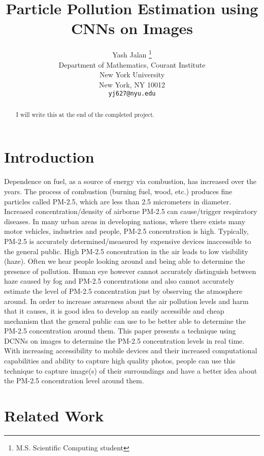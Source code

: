 \documentclass{article}
\title{Particle Pollution Estimation using CNNs on Images}
\author{
  Yash Jalan \thanks{M.S. Scientific Computing student} \\
  Department of Mathematics, Courant Institute\\
  New York University\\
  New York, NY 10012 \\
  \texttt{yj627@nyu.edu} \\
}
\begin{document}
\maketitle

\begin{abstract}
I will write this at the end of the completed project.
\end{abstract}



\section{Introduction}

Dependence on fuel, as a source of energy via combustion, has increased over the years. The process of combustion (burning fuel, wood, etc.) produces fine particles called PM-2.5, which are less than 2.5 micrometers in diameter. Increased concentration/density of airborne PM-2.5 can cause/trigger respiratory diseases. In many urban areas in developing nations, where there exists many motor vehicles, industries and people, PM-2.5 concentration is high. Typically, PM-2.5 is accurately determined/measured by expensive devices inaccessible to the general public. High PM-2.5 concentration in the air leads to low visibility (haze). Often we hear people looking around and being able to determine the presence of pollution. Human eye however cannot accurately distinguish between haze caused by fog and PM-2.5 concentrations  and also cannot accurately estimate the level of  PM-2.5 concentration just by observing the atmosphere around. In order to increase awareness about the air pollution levels and harm that it causes, it is good idea to develop an easily accessible and cheap mechanism that the general public can use to be better able to determine the PM-2.5 concentration around them. This paper presents a technique using DCNNs on images to determine the PM-2.5 concentration levels in real time. With increasing accessibility to mobile devices and their increased computational capabilities and ability to capture high quality photos, people can use this technique to capture image(s) of their surroundings and have a better idea about the PM-2.5 concentration level around them.


\section{Related Work}
\label{sec:related work}
\end{document}
